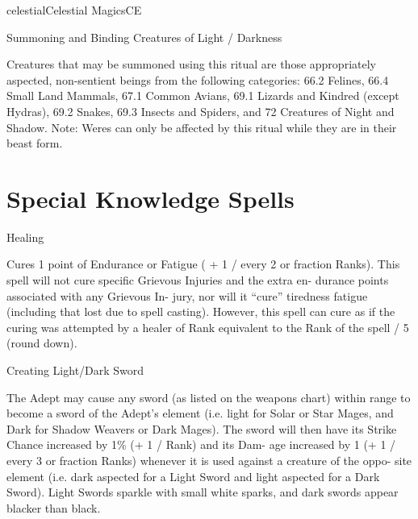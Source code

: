 \begin{College}[1.3]{celestial}{Celestial Magics}{CE}
\begin{ritual}[Q-2]{Summoning and Binding Creatures of Light / Darkness}
\begin{effects}
Creatures  that  may  be  summoned  using  this  ritual 
are 
those  appropriately  aspected,  non-sentient 
beings from the following categories: 66.2 Felines, 
66.4 Small Land Mammals, 67.1 Common Avians, 
69.1  Lizards  and  Kindred  (except  Hydras),  69.2 
Snakes, 69.3 Insects and Spiders, and 72 Creatures 
of  Night  and  Shadow.  Note:  Weres  can  only  be 
affected  by  this  ritual  while  they  are  in their  beast 
form. 
\end{effects}
\end{ritual}


\section{Special Knowledge Spells}

\begin{spell}[S-1]{Healing }

\begin{effects}
Cures 1 point of Endurance or Fatigue ( + 
1  /  every  2  or  fraction  Ranks).  This  spell  will  not 
cure  specific  Grievous  Injuries  and  the  extra  en-
durance  points  associated  with  any  Grievous  In-
jury, nor will it “cure” tiredness fatigue (including 
that  lost  due  to  spell  casting).  However,  this  spell 
can cure as if the curing was attempted by a healer 
of  Rank  equivalent  to  the  Rank  of  the  spell  /  5 
(round down). 
\end{effects}
\end{spell}

\begin{spell}[S-2]{Creating Light/Dark Sword}
\begin{effects}
The Adept may cause any sword (as listed 
on  the  weapons  chart)  within  range  to  become  a 
sword of the Adept’s element (i.e. light for Solar or 
Star  Mages,  and  Dark  for  Shadow  Weavers  or 
Dark  Mages).  The  sword  will  then  have  its  Strike 
Chance increased by 1\% (+ 1 / Rank) and its Dam-
age increased by 1 (+ 1 / every 3 or fraction Ranks) 
whenever it is used against a creature of the oppo-
site  element  (i.e.  dark  aspected  for  a  Light  Sword 
and  light  aspected  for  a  Dark  Sword).  Light 
Swords  sparkle  with  small  white  sparks,  and  dark 
swords appear blacker than black. 
\end{effects}
\end{spell}


\end{College}
